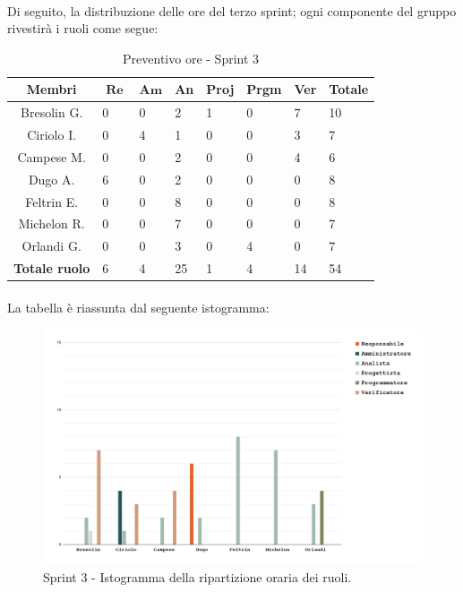 \documentclass[10pt, a4paper]{article}
\begin{document}
{{{{{{{{{{\paragraph{}Di seguito, la distribuzione delle ore del terzo sprint; ogni componente del gruppo rivestirà i ruoli come segue:
\begin{table}[H]
\begin{tabularx}{\textwidth}{c|X|X|X|X|X|X|X}
        \textbf{Membri} & $\operatorname{\textbf{Re}}$ & $\mathrm{\textbf{Am}}$ & \textbf{An} & \textbf{Proj} & \textbf{Prgm} & \textbf{Ver} & \textbf{Totale} \\
        \hline Bresolin G. & 0 & 0 & 2 & 1 & 0 & \cellcolor{primarycolor}7 & 10 \\
        \hline Ciriolo I.  & 0 & \cellcolor{primarycolor}4 & 1 & 0 & 0 & 3 & 7 \\
        \hline Campese M.  & 0 & 0 & \cellcolor{primarycolor}2 & 0 & 0 & 4 & 6 \\
        \hline Dugo A.     & \cellcolor{primarycolor}6 & 0 & 2 & 0 & 0 & 0 & 8 \\
        \hline Feltrin E.  & 0 & 0 & \cellcolor{primarycolor}8 & 0 & 0 & 0 & 8 \\
        \hline Michelon R. & 0 & 0 & \cellcolor{primarycolor}7 & 0 & 0 & 0 & 7 \\
        \hline Orlandi G.  & 0 & 0 & 3 & 0 & \cellcolor{primarycolor}4 & 0 & 7 \\
        \hline
        \textbf{Totale ruolo} & 6 & 4 & 25 & 1 & 4 & 14 & 54 
    \end{tabularx}
    \caption{Preventivo ore - Sprint 3}
    \end{table}

\paragraph{}La tabella è riassunta dal seguente istogramma:
 \begin{figure}[H]
        \centering        
        \includegraphics[width=15.5cm]{istogrammi/istogramma_3_periodo.png}
        \caption{Sprint 3 - Istogramma della ripartizione oraria dei ruoli. }
    \end{figure}

}}}}}}}}}}
\end{document}
